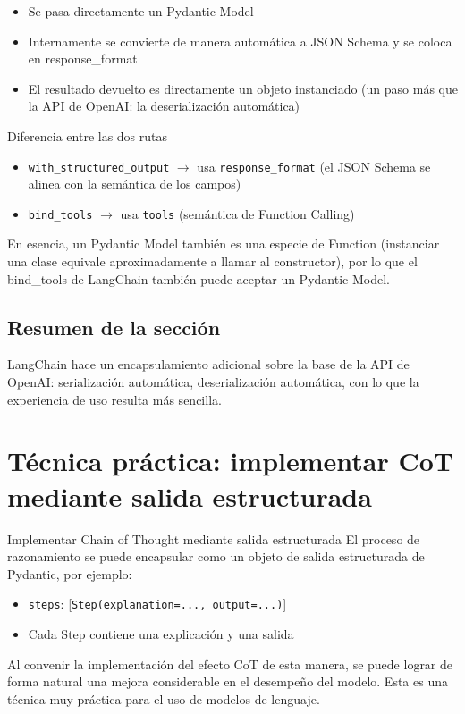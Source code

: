 \documentclass[a4paper]{article}
\begin{document}
\begin{itemize}
    \item Se pasa directamente un Pydantic Model
    \item Internamente se convierte de manera automática a JSON Schema y se coloca en response\_format
    \item El resultado devuelto es directamente un objeto instanciado (un paso más que la API de OpenAI: la deserialización automática)
\end{itemize}

\begin{warningbox}{Diferencia entre las dos rutas}
\begin{itemize}
    \item \texttt{with\_structured\_output} $\rightarrow$ usa \texttt{response\_format} (el JSON Schema se alinea con la semántica de los campos)
    \item \texttt{bind\_tools} $\rightarrow$ usa \texttt{tools} (semántica de Function Calling)
\end{itemize}
En esencia, un Pydantic Model también es una especie de Function (instanciar una clase equivale aproximadamente a llamar al constructor), por lo que el bind\_tools de LangChain también puede aceptar un Pydantic Model.
\end{warningbox}

\subsection{Resumen de la sección}

LangChain hace un encapsulamiento adicional sobre la base de la API de OpenAI: serialización automática, deserialización automática, con lo que la experiencia de uso resulta más sencilla.

\section{Técnica práctica: implementar CoT mediante salida estructurada}

\begin{importantbox}{Implementar Chain of Thought mediante salida estructurada}
El proceso de razonamiento se puede encapsular como un objeto de salida estructurada de Pydantic, por ejemplo:
\begin{itemize}
    \item \texttt{steps}: {[}\texttt{Step(explanation=..., output=...)}{]}
    \item Cada Step contiene una explicación y una salida
\end{itemize}
Al convenir la implementación del efecto CoT de esta manera, se puede lograr de forma natural una mejora considerable en el desempeño del modelo. Esta es una técnica muy práctica para el uso de modelos de lenguaje.
\end{importantbox}
\end{document}
